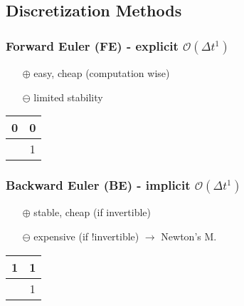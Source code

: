 \subsection{Discretization Methods}
    \subsubsection{Forward Euler (FE) - explicit \texorpdfstring{\hfill $\mathcal{O}(\Delta t^1)$}{O(t1)}}
        \vspace{0.5em}
        \begin{minipage}{0.91\linewidth}
            \begin{itemize}
                \item[$\oplus$] easy, cheap (computation wise)
                \item[$\ominus$] limited stability 
            \end{itemize}
        \end{minipage}
        \begin{minipage}{0.08\linewidth}
            \begin{tabular}{c|c}
                0&0\\\hline
                &1
            \end{tabular}            
        \end{minipage}
    \subsubsection{Backward Euler (BE) - implicit \texorpdfstring{\hfill $\mathcal{O}(\Delta t^1)$}{O(t1)}}\label{subsubsec::BE}
        \vspace{0.5em}
        \begin{minipage}{0.91\linewidth}
            \begin{itemize}
                \item[$\oplus$] stable, cheap (if invertible)
                \item[$\ominus$] expensive (if !invertible) $\rightarrow$ Newton's M.
            \end{itemize}
        \end{minipage}
        \begin{minipage}{0.08\linewidth}
            \begin{tabular}{c|c}
                1&1\\\hline
                &1
            \end{tabular}            
        \end{minipage}
